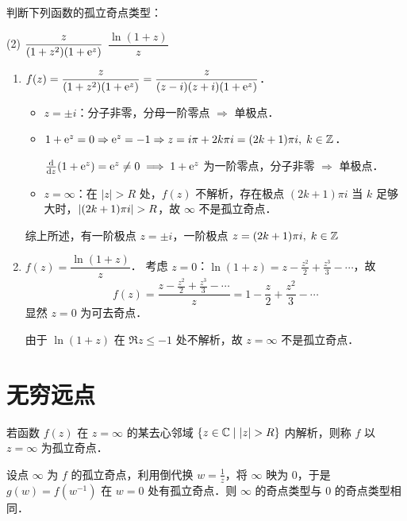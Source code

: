 \documentclass[12pt, a4paper, oneside, UTF8]{ctexbook}
\begin{document}
\begin{example}
    判断下列函数的孤立奇点类型：
    \begin{tasks}[label=(\arabic*)](2)
        \task $\dfrac{z}{(1+z^2)(1+\mathrm{e}^z)}$
        \task $\dfrac{\ln(1+z)}{z}$
    \end{tasks}
\end{example}
\begin{solution}
    \begin{enumerate}[label=(\arabic*)]
        \item $f(z) = \dfrac{z}{(1+z^2)(1+\mathrm{e}^z)} = \dfrac{z}{(z-i)(z+i)(1+\mathrm{e}^z)}$．
              \begin{itemize}
                  \item $z = \pm i$：分子非零，分母一阶零点 $\Rightarrow$ 单极点．
                  \item $1+\mathrm{e}^z = 0 \Rightarrow \mathrm{e}^z = -1 \Rightarrow z = i\pi + 2k\pi i = (2k+1)\pi i,\; k\in\mathbb{Z}$．
                  
                        $\frac{\mathrm{d}}{\mathrm{d} z}(1+\mathrm{e}^z)=\mathrm{e}^z\neq 0 \implies 1+\mathrm{e}^z$ 为一阶零点，分子非零 $\Rightarrow$ 单极点．
                  \item $z=\infty$：在 $|z|>R$ 处，$f(z)$ 不解析，存在极点 $(2k+1)\pi i$ 当 $k$ 足够大时，$\abs{(2k+1)\pi i}>R$，故 $\infty$ 不是孤立奇点．
              \end{itemize}
              综上所述，有一阶极点 $z = \pm i$，一阶极点 $z = (2k+1)\pi i,\; k\in\mathbb{Z}$
        
        \item $f(z) = \dfrac{\ln(1+z)}{z}$．
              考虑 $z=0$：$\ln(1+z) = z - \frac{z^2}{2} + \frac{z^3}{3} - \cdots$，故
              \[
              f(z) = \frac{z - \frac{z^2}{2} + \frac{z^3}{3} - \cdots}{z} = 1 - \frac{z}{2} + \frac{z^2}{3} - \cdots
              \]
              显然 $z=0$ 为可去奇点．

              由于 $\ln(1+z)$ 在 $\Re z \le -1$ 处不解析，故 $z=\infty$ 不是孤立奇点．
    \end{enumerate}
\end{solution}

\section{无穷远点}
\begin{definition}[无穷远点为孤立奇点]
    若函数 $f(z)$ 在 $z=\infty$ 的某去心邻域 $\{z\in\mathbb{C}\mid \abs{z}>R\}$ 内解析，则称 $f$ 以 $z=\infty$ 为孤立奇点．
\end{definition}
\begin{theorem}[无穷远点的奇点类型]
    设点 $\infty$ 为 $f$ 的孤立奇点，利用倒代换 $w = \frac{1}{z}$，将 $\infty$ 映为 $0$，于是 $g(w)=f(w^{-1})$ 在 $w=0$ 处有孤立奇点．则 $\infty$ 的奇点类型与 $0$ 的奇点类型相同．
\end{theorem}
\end{document}
